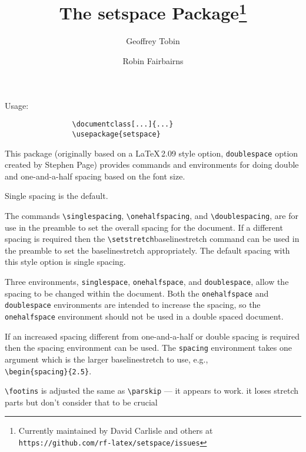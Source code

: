 \documentclass[a4paper]{article}
\title{The setspace Package\thanks{Currently maintained by David Carlisle and others at\\\texttt{https://github.com/rf-latex/setspace/issues}}}
\date{\filedate}
\author{Geoffrey Tobin\and Robin Fairbairns}
\begin{document}
\maketitle

 Usage:

\begin{verbatim}
                \documentclass[...]{...}
                \usepackage{setspace}
\end{verbatim}


         This package (originally based on a \LaTeX\,2.09 style
         option, \texttt{doublespace} option created by Stephen Page)
         provides commands and environments for doing double and
         one-and-a-half spacing based on the font size.

         Single spacing is the default.

         The commands \verb|\singlespacing|, \verb|\onehalfspacing|, and
         \verb|\doublespacing|, are for use in the preamble to set the overall
         spacing for the document.  If a different spacing is required then
         the \verb|\setstretch|{baselinestretch} command can be used in the
         preamble to set the baselinestretch appropriately.  The default
         spacing with this style option is single spacing.

         Three environments, \verb|singlespace|, \verb|onehalfspace|,
         and \verb|doublespace|, allow the spacing to be changed
         within the document.  Both the \verb|onehalfspace| and
         \verb|doublespace| environments are intended to increase the
         spacing, so the \verb|onehalfspace| environment should not be
         used in a double spaced document.

         If an increased spacing different from one-and-a-half or
         double spacing is required then the spacing environment can
         be used.  The \verb|spacing| environment takes one argument
         which is the larger baselinestretch to use, e.g.,\\
         \verb|\begin{spacing}{2.5}|.

           \verb|\footins| is adjusted the same as \verb|\parskip| ---
           it appears to work. it loses stretch parts but don't
           consider that to be crucial


\clearpage
\addtolength\textwidth{100pt}
\addtolength\oddsidemargin{-70pt}
\setlength\columnseprule{1pt}
\setlength\columnsep{10pt}
\twocolumn
\tiny

\end{document}
